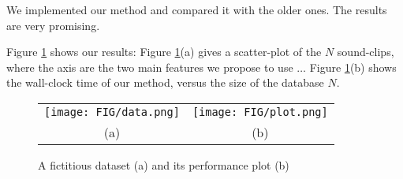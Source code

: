 We implemented our method
and compared it with the older ones.
The results are very promising.

Figure \ref{fig:results} shows our results:
Figure \ref{fig:results}(a) gives a scatter-plot
of the $N$ sound-clips, where the axis are the two main
features we propose to use $\ldots$
Figure \ref{fig:results}(b) shows the wall-clock time
of our method, versus the size of the database $N$.

\begin{figure}[htb]
\begin{center}
\begin{tabular}{cc}
     \texttt{[image: FIG/data.png]} &
     \texttt{[image: FIG/plot.png]} \\
    (a) & (b) 
\end{tabular}
\caption{A fictitious dataset (a) and its performance plot (b)}
\label{fig:results}
\end{center}
\end{figure}

